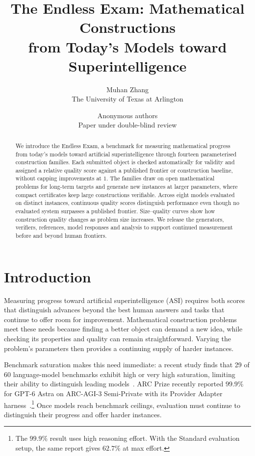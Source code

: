 \documentclass{article}
\title{The Endless Exam: Mathematical Constructions\\from Today's Models toward Superintelligence}
\author{Muhan Zhang\\The University of Texas at Arlington}
\author{Anonymous authors\\Paper under double-blind review}
\begin{document}
\maketitle
\ifdefined\EndlessExamPreprint
\lhead{}\renewcommand{\headrulewidth}{0pt}
\fi

\begin{abstract}
We introduce the Endless Exam, a benchmark for measuring mathematical progress from today's models toward artificial superintelligence through fourteen parameterised construction families. Each submitted object is checked automatically for validity and assigned a relative quality score against a published frontier or construction baseline, without capping improvements at $1$. The families draw on open mathematical problems for long-term targets and generate new instances at larger parameters, where compact certificates keep large constructions verifiable. Across eight models evaluated on \DistinctN{} distinct instances, continuous quality scores distinguish performance even though no evaluated system surpasses a published frontier. Size--quality curves show how construction quality changes as problem size increases. We release the generators, verifiers, references, model responses and analysis to support continued measurement before and beyond human frontiers.
\end{abstract}

\section{Introduction}

Measuring progress toward artificial superintelligence (ASI) requires both scores that distinguish advances beyond the best human answers and tasks that continue to offer room for improvement. Mathematical construction problems meet these needs because finding a better object can demand a new idea, while checking its properties and quality can remain straightforward. Varying the problem's parameters then provides a continuing supply of harder instances.

Benchmark saturation makes this need immediate: a recent study finds that 29 of 60 language-model benchmarks exhibit high or very high saturation, limiting their ability to distinguish leading models~\citep{akhtar2026saturation}. ARC Prize recently reported $99.9\%$ for GPT-6 Astra on ARC-AGI-3 Semi-Private with its Provider Adapter harness~\citep{kamradt2026astra}.\footnote{The $99.9\%$ result uses high reasoning effort. With the Standard evaluation setup, the same report gives $62.7\%$ at max effort.} Once models reach benchmark ceilings, evaluation must continue to distinguish their progress and offer harder instances.
\end{document}
